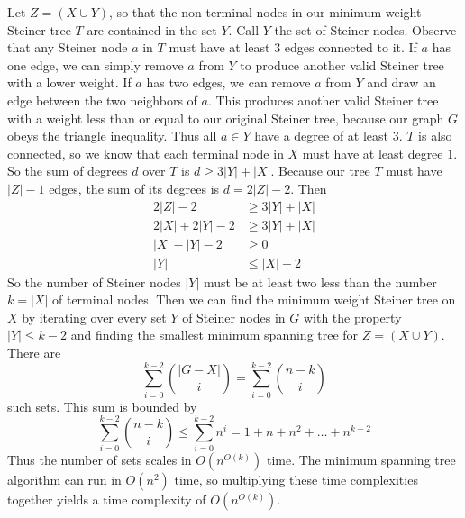 \documentclass[12pt]{article}
\begin{document}
Let \(Z=(X\cup Y)\), so that the non terminal nodes in our minimum-weight Steiner tree \(T\) are contained in the set \(Y\). Call \(Y\)
the set of Steiner nodes. Observe that any Steiner node \(a\) in \(T\) must have at least \(3\) edges connected to it. If \(a\) has one edge,
we can simply remove \(a\) from \(Y\) to produce another valid Steiner tree with a lower weight. If \(a\) has two edges, we can remove \(a\)
from \(Y\) and draw an edge between the two neighbors of \(a\). This produces another valid Steiner tree with a weight less than or equal to
our original Steiner tree, because our graph \(G\) obeys the triangle inequality. Thus all \(a\in Y\) have a degree of at least \(3\). \(T\)
is also connected, so we know that each terminal node in \(X\) must have at least degree \(1\). So the sum of degrees \(d\) over \(T\)
is \(d\geq 3|Y|+|X|\). Because our tree \(T\) must have \(|Z|-1\) edges, the sum of its degrees is \(d=2|Z|-2\). Then
\begin{align*}
        2|Z|-2&\geq 3|Y|+|X|\\
        2|X|+2|Y|-2&\geq 3|Y|+|X|\\
        |X|-|Y|-2&\geq 0\\
        |Y|&\leq |X|-2
\end{align*}
So the number of Steiner nodes \(|Y|\) must be at least two less than the number \(k=|X|\) of terminal nodes. Then we can find the minimum weight
Steiner tree on \(X\) by iterating over every set \(Y\) of Steiner nodes in \(G\) with the property \(|Y|\leq k-2\) and finding the smallest
minimum spanning tree for \(Z=(X\cup Y)\). There are
\[\sum_{i=0}^{k-2}\binom{|G-X|}{i}=\sum_{i=0}^{k-2}\binom{n-k}{i}\]
such sets. This sum is bounded by
\[\sum_{i=0}^{k-2}\binom{n-k}{i}\leq\sum_{i=0}^{k-2}n^i = 1 + n + n^2 + \ldots + n^{k-2}\]
Thus the number of sets scales in \(O(n^{O(k)})\) time. The minimum spanning tree algorithm can run in \(O(n^2)\) time, so multiplying these time
complexities together yields a time complexity of \(O(n^{O(k)})\).
\end{document}
